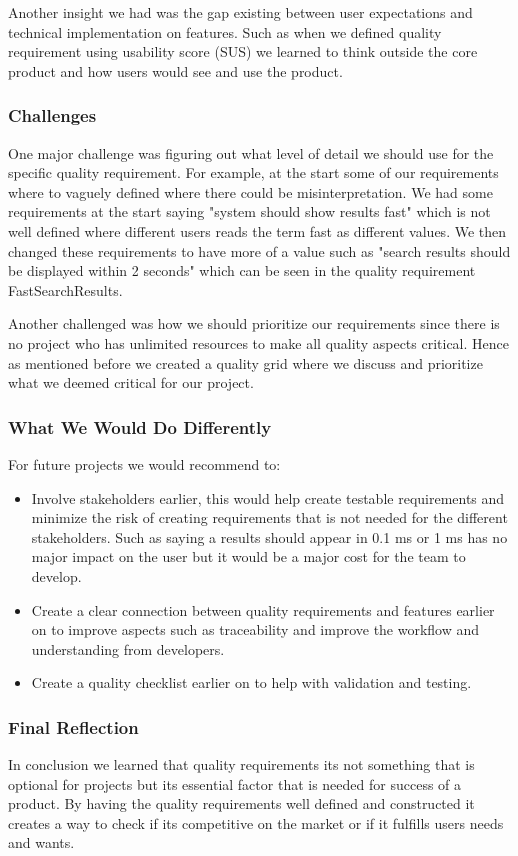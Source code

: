 Another insight we had was the gap existing between user expectations and technical implementation on features. Such as when we defined quality requirement using usability score (SUS) we learned to think outside the core product and how users would see and use the product.  


\subsubsection{Challenges}
One major challenge was figuring out what level of detail we should use for the specific quality requirement. For example, at the start some of our requirements where to vaguely defined where there could be misinterpretation. We had some requirements at the start saying "system should show results fast" which is not well defined where different users reads the term fast as different values. We then changed these requirements to have more of a value such as "search results should be displayed within 2 seconds" which can be seen in the quality requirement FastSearchResults.

Another challenged was how we should prioritize our requirements since there is no project who has unlimited resources to make all quality aspects critical. Hence as mentioned before we created a quality grid where we discuss and prioritize what we deemed critical for our project.


\subsubsection{What We Would Do Differently}
For future projects we would recommend to:
\begin{itemize}
    \item Involve stakeholders earlier, this would help create testable requirements and minimize the risk of creating requirements that is not needed for the different stakeholders. Such as saying a results should appear in 0.1 ms or 1 ms has no major impact on the user but it would be a major cost for the team to develop.
    \item Create a clear connection between quality requirements and features earlier on to improve aspects such as traceability and improve the workflow and understanding from developers.
    \item Create a quality checklist earlier on to help with validation and testing.
\end{itemize}

\subsubsection{Final Reflection}
In conclusion we learned that quality requirements its not something that is optional for projects but its essential factor that is needed for success of a product. By having the quality requirements well defined and constructed it creates a way to check if its competitive on the market or if it fulfills users needs and wants.




